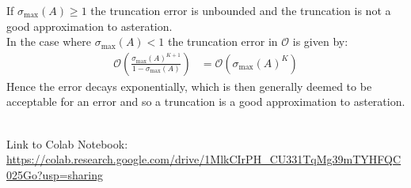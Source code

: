 \documentclass[a4paper,12pt]{ETHexercise}
\begin{document}
\begin{question}
\begin{subquestion}
		If $\sigma_{\text{max}}(A) \geq 1$ the truncation error is unbounded and the truncation is not a good approximation to asteration.\\
		In the case where $\sigma_{\text{max}}(A) < 1$ the truncation error in $\mathcal{O}$ is given by:
		\begin{align}
			\mathcal{O}\left( \frac{\sigma_{\text{max}}(A)^{K+1}}{1 - \sigma_{\text{max}}(A)} \right) & = \mathcal{O} \left( \sigma_{\text{max}}(A)^K \right)
		\end{align}
		Hence the error decays exponentially, which is then generally deemed to be acceptable for an error and so a truncation is a good approximation to asteration.
	\end{subquestion}
\end{question}
\begin{question}\\
	Link to Colab Notebook: \url{https://colab.research.google.com/drive/1MlkCIrPH_CU331TqMg39mTYHFQC025Go?usp=sharing}
\end{question}
\end{document}
